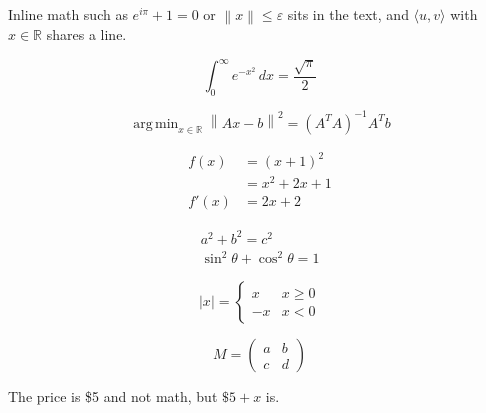 \documentclass{article}
\newcommand{\R}{\mathbb{R}}
\newcommand{\norm}[1]{\left\lVert #1 \right\rVert}
\newcommand{\inner}[2]{\langle #1, #2 \rangle}
\DeclareMathOperator*{\argmin}{arg\,min}
\def\eps{\varepsilon}
\begin{document}
Inline math such as $e^{i\pi} + 1 = 0$ or \(\norm{x} \le \eps\) sits in the text,
and $\inner{u}{v}$ with $x \in \R$ shares a line.

\[ \int_0^\infty e^{-x^2}\,dx = \frac{\sqrt{\pi}}{2} \]

\begin{equation}
  \argmin_{x \in \R} \norm{Ax - b}^2 = (A^T A)^{-1} A^T b
\end{equation}

\begin{align}
  f(x) &= (x+1)^2 \\
       &= x^2 + 2x + 1 \\
  f'(x) &= 2x + 2
\end{align}

\begin{gather*}
  a^2 + b^2 = c^2 \\
  \sin^2\theta + \cos^2\theta = 1
\end{gather*}

\[
  |x| = \begin{cases} x & x \ge 0 \\ -x & x < 0 \end{cases}
\]

\[
  M = \begin{pmatrix} a & b \\ c & d \end{pmatrix}
\]

The price is \$5 and not math, but $\$5 + x$ is.
\end{document}
